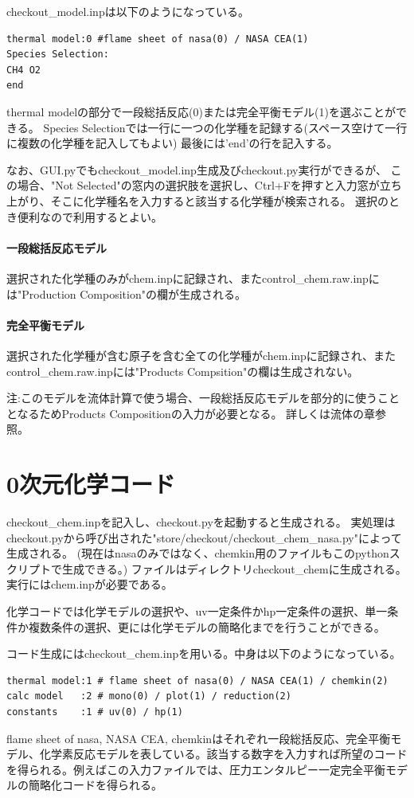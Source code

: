 \documentclass{jsarticle}
\begin{document}
checkout\_model.inpは以下のようになっている。
\begin{verbatim}
thermal model:0 #flame sheet of nasa(0) / NASA CEA(1)
Species Selection:
CH4 O2
end
\end{verbatim}
thermal modelの部分で一段総括反応(0)または完全平衡モデル(1)を選ぶことができる。
Species Selectionでは一行に一つの化学種を記録する(スペース空けて一行に複数の化学種を記入してもよい)
最後には'end'の行を記入する。

なお、GUI.pyでもcheckout\_model.inp生成及びcheckout.py実行ができるが、
この場合、"Not Selected"の窓内の選択肢を選択し、Ctrl+Fを押すと入力窓が立ち上がり、そこに化学種名を入力すると該当する化学種が検索される。
選択のとき便利なので利用するとよい。

\paragraph{一段総括反応モデル}
選択された化学種のみがchem.inpに記録され、またcontrol\_chem.raw.inpには"Production Composition"の欄が生成される。

\paragraph{完全平衡モデル}
選択された化学種が含む原子を含む全ての化学種がchem.inpに記録され、またcontrol\_chem.raw.inpには"Products Compsition"の欄は生成されない。

注:このモデルを流体計算で使う場合、一段総括反応モデルを部分的に使うこととなるためProducts Compositionの入力が必要となる。
詳しくは流体の章参照。
\newpage
\section{0次元化学コード}%
checkout\_chem.inpを記入し、checkout.pyを起動すると生成される。
実処理はcheckout.pyから呼び出された"store/checkout/checkout\_chem\_nasa.py"によって生成される。
(現在はnasaのみではなく、chemkin用のファイルもこのpythonスクリプトで生成できる。)
ファイルはディレクトリcheckout\_chemに生成される。
実行にはchem.inpが必要である。

化学コードでは化学モデルの選択や、uv一定条件かhp一定条件の選択、単一条件か複数条件の選択、更には化学モデルの簡略化までを行うことができる。

コード生成にはcheckout\_chem.inpを用いる。中身は以下のようになっている。
\begin{verbatim}
thermal model:1 # flame sheet of nasa(0) / NASA CEA(1) / chemkin(2)
calc model   :2 # mono(0) / plot(1) / reduction(2)
constants    :1 # uv(0) / hp(1)
\end{verbatim}
flame sheet of nasa, NASA CEA, chemkinはそれぞれ一段総括反応、完全平衡モデル、化学素反応モデルを表している。該当する数字を入力すれば所望のコードを得られる。例えばこの入力ファイルでは、圧力エンタルピー一定完全平衡モデルの簡略化コードを得られる。
\end{document}

